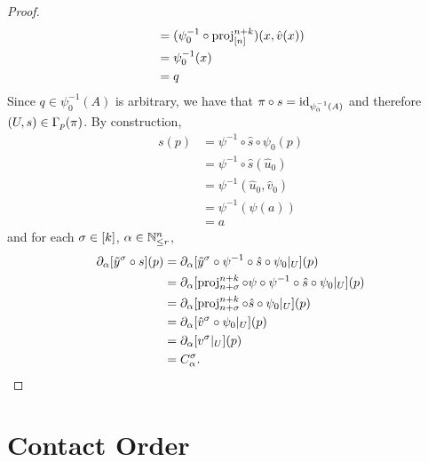 \documentclass{book}
\begin{document}
\begin{proof}
\begin{align*}
		& = (\psi_0^{-1} \circ \operatorname{\text{proj}}^{n+k}_{[n]}) (x, \hat{v}(x)) \\
		& = \psi_0^{-1}(x) \\
		& = q
	\end{align*}
	Since $q \in \psi_0^{-1}(A)$ is arbitrary, we have that $\pi \circ s = \operatorname{id}_{\psi_0^{-1}(A)}$ and therefore $(U, s) \in \Gamma_{p}(\pi)$. By construction, 
	\begin{align*}
		s(p)
		& = \psi^{-1} \circ \hat{s} \circ \psi_0(p) \\
		& = \psi^{-1} \circ \hat{s}(\hat{u}_0) \\
		& = \psi^{-1}(\hat{u}_0, \hat{v}_0) \\
		& = \psi^{-1}(\psi(a)) \\
		& = a
	\end{align*}
	and for each $\sigma\in [k]$, $\alpha \in \mathbb{N}^n_{\leq r}$, 
	\begin{align*}
		\partial_{\alpha}[\tilde{y}^{\sigma} \circ s](p) 
		& = \partial_{\alpha}[\tilde{y}^{\sigma} \circ \psi^{-1} \circ \hat{s} \circ \psi_0|_U](p) \\
		& = \partial_{\alpha}[\operatorname{\text{proj}}^{n+k}_{n+\sigma} \circ \psi \circ \psi^{-1} \circ \hat{s} \circ \psi_0|_U](p) \\
		& = \partial_{\alpha}[\operatorname{\text{proj}}^{n+k}_{n+\sigma} \circ \hat{s} \circ \psi_0|_U ](p) \\
		& = \partial_{\alpha}[ \hat{v}^{\sigma} \circ \psi_0|_U](p) \\
		& = \partial_{\alpha}[ v^{\sigma}|_U](p) \\
		& = C^{\sigma}_{\alpha}.
	\end{align*}
\end{proof}


































\newpage

\section{Contact Order} 
\end{document}
